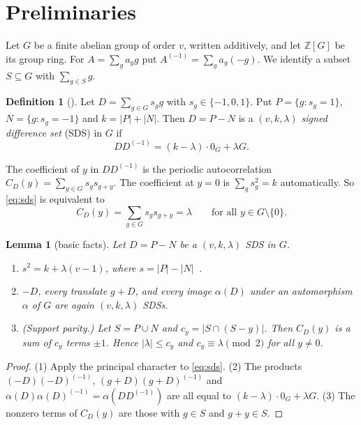 \documentclass[11pt]{article}
\numberwithin{equation}{section}
\newtheorem{lemma}[theorem]{Lemma}
\theoremstyle{definition}
\newtheorem{definition}[theorem]{Definition}
\theoremstyle{remark}
\newcommand{\Z}{\mathbb Z}
\begin{document}
\section{Preliminaries}\label{sec:prelim}

Let $G$ be a finite abelian group of order $v$, written additively, and let $\Z[G]$ be its group
ring. For $A=\sum_g a_g g$ put $A^{(-1)}=\sum_g a_g(-g)$. We identify a subset $S\subseteq G$ with
$\sum_{g\in S}g$.

\begin{definition}[\cite{Gordon2023}]
Let $D=\sum_{g\in G}s_g g$ with $s_g\in\{-1,0,1\}$. Put $P=\{g:s_g=1\}$, $N=\{g:s_g=-1\}$ and
$k=|P|+|N|$. Then $D=P-N$ is a \emph{$(v,k,\lambda)$ signed difference set} (SDS) in $G$ if
\begin{equation}\label{eq:sds}
DD^{(-1)}=(k-\lambda)\cdot 0_G+\lambda G .
\end{equation}
\end{definition}

The coefficient of $y$ in $DD^{(-1)}$ is the periodic autocorrelation
$C_D(y)=\sum_{g\in G}s_g s_{g+y}$. The coefficient at $y=0$ is $\sum_g s_g^2=k$ automatically.
So \eqref{eq:sds} is equivalent to
\begin{equation}\label{eq:autocorr}
C_D(y)=\sum_{g\in G}s_gs_{g+y}=\lambda\qquad\text{for all }y\in G\setminus\{0\}.
\end{equation}

\begin{lemma}[basic facts]\label{lem:basic}
Let $D=P-N$ be a $(v,k,\lambda)$ SDS in $G$.
\begin{enumerate}
\item $s^2=k+\lambda(v-1)$, where $s=|P|-|N|$~\cite{Gordon2023}.
\item $-D$, every translate $g+D$, and every image $\alpha(D)$ under an automorphism $\alpha$ of $G$
are again $(v,k,\lambda)$ SDSs.
\item (Support parity.) Let $S=P\cup N$ and $c_y=|S\cap(S-y)|$. Then $C_D(y)$ is a sum of $c_y$ terms
$\pm1$. Hence $|\lambda|\le c_y$ and $c_y\equiv\lambda\pmod 2$ for all $y\ne0$.
\end{enumerate}
\end{lemma}
\begin{proof}
(1) Apply the principal character to \eqref{eq:sds}. (2) The products $(-D)(-D)^{(-1)}$,
$(g+D)(g+D)^{(-1)}$ and $\alpha(D)\alpha(D)^{(-1)}=\alpha(DD^{(-1)})$ are all equal to
$(k-\lambda)\cdot0_G+\lambda G$. (3) The nonzero terms of $C_D(y)$ are those with $g\in S$ and
$g+y\in S$.
\end{proof}
\end{document}

